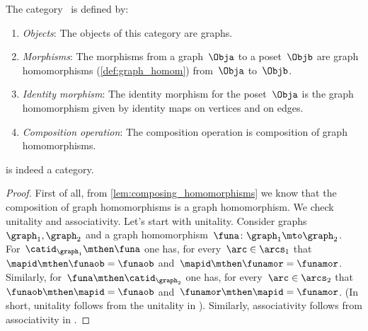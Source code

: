 \begin{ctdefinition}
    \label{def:Grph}
    The category~\iindex{\Grph} is defined by:
    \begin{enumerate}
        \item \emph{Objects}: The objects of this category are graphs.
        \item \emph{Morphisms}: The morphisms from a graph~$\Obja$ to a poset~$\Objb$ are graph homomorphisms (\cref{def:graph_homom}) from~$\Obja$ to~$\Objb$.
        \item \emph{Identity morphism}: The identity morphism for the poset~$\Obja$
              is the graph homomorphism given by identity maps on vertices and on edges.
        \item \emph{Composition operation}: The composition operation is composition of graph homomorphisms.
    \end{enumerate}
\end{ctdefinition}

\begin{lemma}
    \Grph is indeed a category.
\end{lemma}

\begin{proof}
    First of all, from \cref{lem:composing_homomorphisms} we know that the composition of graph homomorphisms is a graph homomorphism.
    We check unitality and associativity.
    Let's start with unitality.
    Consider graphs~$\graph_1,\graph_2$ and a graph homomorphism~$\funa\colon \graph_1\mto \graph_2$.
    For~$\catid_{\graph_1}\mthen \funa$ one has, for every~$\arc \in \arcs_1$ that~$\mapid\mthen \funaob=\funaob$ and~$\mapid\mthen \funamor=\funamor$.
    Similarly, for~$\funa \mthen \catid_{\graph_2}$ one has, for every~$\arc \in \arcs_2$ that~$\funaob\mthen \mapid=\funaob$ and~$\funamor \mthen \mapid=\funamor$.
    (In short, unitality follows from the unitality in \Set).
    Similarly, associativity follows from associativity in \Set.
\end{proof}